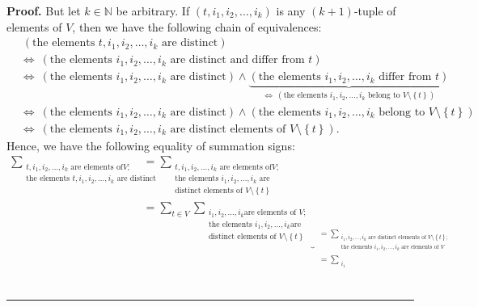 \documentclass[numbers=enddot,12pt,final,onecolumn,notitlepage]{scrartcl}%
\theoremstyle{definition}
\newenvironment{proof}[1][Proof]{\noindent\textbf{#1.} }{\ \rule{0.5em}{0.5em}}
\let\sumnonlimits\sum
\renewcommand{\sum}{\sumnonlimits\limits}
\newenvironment{verlong}{}{}
\begin{document}
\begin{verlong}
\begin{proof}
But let $k\in\mathbb{N}$ be arbitrary. If $\left(  t,i_{1},i_{2},\ldots
,i_{k}\right)  $ is any $\left(  k+1\right)  $-tuple of elements of $V$, then
we have the following chain of equivalences:%
\begin{align*}
&  \ \left(  \text{the elements }t,i_{1},i_{2},\ldots,i_{k}\text{ are
distinct}\right) \\
&  \Longleftrightarrow\ \left(  \text{the elements }i_{1},i_{2},\ldots
,i_{k}\text{ are distinct and differ from }t\right) \\
&  \Longleftrightarrow\ \left(  \text{the elements }i_{1},i_{2},\ldots
,i_{k}\text{ are distinct}\right)  \wedge\underbrace{\left(  \text{the
elements }i_{1},i_{2},\ldots,i_{k}\text{ differ from }t\right)  }%
_{\Longleftrightarrow\ \left(  \text{the elements }i_{1},i_{2},\ldots
,i_{k}\text{ belong to }V\setminus\left\{  t\right\}  \right)  }\\
&  \Longleftrightarrow\ \left(  \text{the elements }i_{1},i_{2},\ldots
,i_{k}\text{ are distinct}\right)  \wedge\left(  \text{the elements }%
i_{1},i_{2},\ldots,i_{k}\text{ belong to }V\setminus\left\{  t\right\}
\right) \\
&  \Longleftrightarrow\ \left(  \text{the elements }i_{1},i_{2},\ldots
,i_{k}\text{ are distinct elements of }V\setminus\left\{  t\right\}  \right)
.
\end{align*}
Hence, we have the following equality of summation signs:%
\begin{align}
\sum_{\substack{t,i_{1},i_{2},\ldots,i_{k}\text{ are elements of
}V;\\\text{the elements }t,i_{1},i_{2},\ldots,i_{k}\text{ are distinct}}}  &
=\sum_{\substack{t,i_{1},i_{2},\ldots,i_{k}\text{ are elements of
}V;\\\text{the elements }i_{1},i_{2},\ldots,i_{k}\text{ are}\\\text{distinct
elements of }V\setminus\left\{  t\right\}  }}\nonumber\\
&  =\sum_{t\in V}\underbrace{\sum_{\substack{i_{1},i_{2},\ldots,i_{k}\text{
are elements of }V;\\\text{the elements }i_{1},i_{2},\ldots,i_{k}\text{
are}\\\text{distinct elements of }V\setminus\left\{  t\right\}  }%
}}_{\substack{=\sum_{\substack{i_{1},i_{2},\ldots,i_{k}\text{ are distinct
elements of }V\setminus\left\{  t\right\}  ;\\\text{the elements }i_{1}%
,i_{2},\ldots,i_{k}\text{ are elements of }V}}\\=\sum_{\substack{i_{1}%
}}}}
\end{align}
\end{proof}
\end{verlong}
\end{document}
